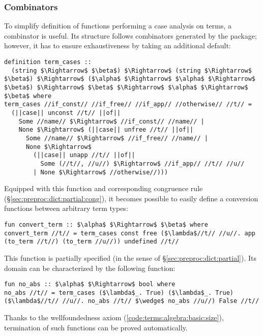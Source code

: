 \subsubsection{Combinators}
To simplify definition of functions performing a case analysis on terms, a  combinator is useful.
Its structure follows  combinators generated by the  package; however, it has to ensure exhaustiveness by taking an additional default:
%
\begin{lstlisting}[language=Isabelle]
definition term_cases ::
  (string $\Rightarrow$ $\beta$) $\Rightarrow$ (string $\Rightarrow$ $\beta$) $\Rightarrow$ ($\alpha$ $\Rightarrow$ $\alpha$ $\Rightarrow$ $\beta$) $\Rightarrow$ $\beta$ $\Rightarrow$ $\alpha$ $\Rightarrow$ $\beta$ where
term_cases //if_const// //if_free// //if_app// //otherwise// //t// =
  (||case|| unconst //t// ||of||
    Some //name// $\Rightarrow$ //if_const// //name// |
    None $\Rightarrow$ (||case|| unfree //t// ||of||
      Some //name// $\Rightarrow$ //if_free// //name// |
      None $\Rightarrow$
        (||case|| unapp //t// ||of||
          Some (//t//, //u//) $\Rightarrow$ //if_app// //t// //u//
        | None $\Rightarrow$ //otherwise//)))
\end{lstlisting}
%
Equipped with this function and corresponding congruence rule (§\ref{sec:preproc:dict:partial:cong}), it becomes possible to easily define a conversion functions between arbitrary term types:
%
\begin{lstlisting}[language=Isabelle]
fun convert_term :: $\alpha$ $\Rightarrow$ $\beta$ where
convert_term //t// = term_cases const free ($\lambda$//t// //u//. app (to_term //t//) (to_term //u//)) undefined //t//
\end{lstlisting}
%
This function is partially specified (in the sense of §\ref{sec:preproc:dict:partial}).
Its domain can be characterized by the following function:
%
\begin{lstlisting}[language=Isabelle]
fun no_abs :: $\alpha$ $\Rightarrow$ bool where
no_abs //t// = term_cases ($\lambda$_. True) ($\lambda$_. True) ($\lambda$//t// //u//. no_abs //t// $\wedge$ no_abs //u//) False //t//
\end{lstlisting}
%
Thanks to the wellfoundedness axiom (\cref{code:terms:algebra:basic:size}), termination of such functions can be proved automatically.


